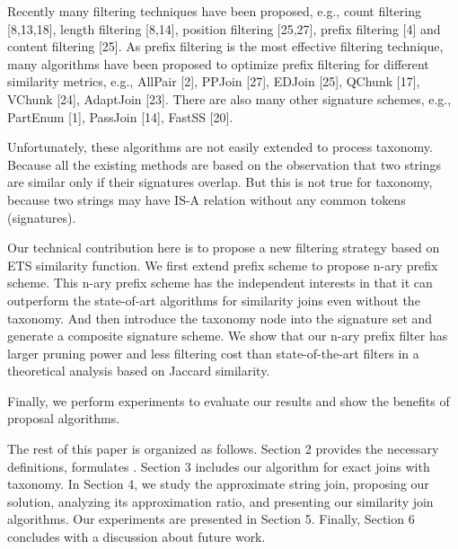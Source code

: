 Recently many filtering techniques have been proposed, e.g., count filtering [8,13,18], length filtering [8,14], position
filtering [25,27], prefix filtering [4] and content filtering [25]. As prefix filtering is the most effective filtering technique,
many algorithms have been proposed to optimize prefix filtering for different similarity metrics, e.g., AllPair [2],
PPJoin [27], EDJoin [25], QChunk [17], VChunk [24], AdaptJoin [23]. There are also many other signature schemes, e.g., PartEnum [1],
PassJoin [14], FastSS [20].

Unfortunately, these algorithms are not easily extended to process taxonomy. Because all the existing methods are based on the observation that two strings are similar only if their signatures overlap. But this is not true for taxonomy, because two strings may have IS-A relation without any common tokens (signatures).

Our technical contribution here is to propose a new filtering strategy based on ETS similarity function. We first extend prefix scheme to propose n-ary prefix scheme. This n-ary prefix scheme has the independent interests in that it can outperform the state-of-art algorithms  for similarity joins even without the taxonomy. And then introduce the taxonomy node into the signature set and generate a composite signature scheme. We show that our n-ary prefix
filter has larger pruning power and less filtering cost
than state-of-the-art filters in a theoretical analysis based on Jaccard similarity.


Finally, we perform experiments to evaluate our results and show the benefits of proposal algorithms.

%
%
%
%



\smallskip

The rest of this paper is organized as follows. Section 2
provides the necessary definitions, formulates . Section
3 includes our algorithm for exact joins with taxonomy. In Section 4, we study
the approximate string join, proposing our solution, analyzing its approximation
ratio, and presenting our similarity join algorithms.
Our experiments are presented in Section 5. Finally,
Section 6 concludes with a discussion about future work.
